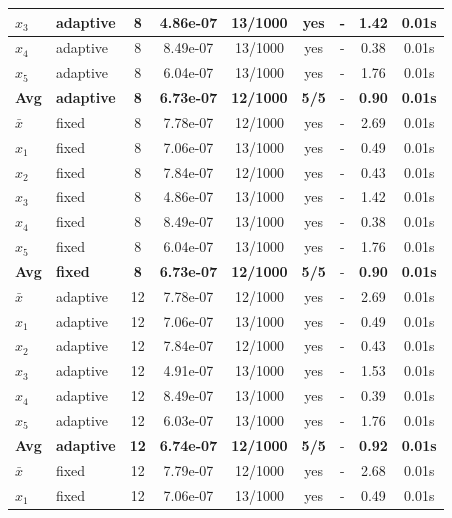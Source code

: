 \begin{longtable}{|l|l|c|c|c|c|c|c|c|}
\hline
$x_3$ & adaptive & 8 & 4.86e-07 & 13/1000 & yes & - & 1.42 & 0.01s \\
\hline
$x_4$ & adaptive & 8 & 8.49e-07 & 13/1000 & yes & - & 0.38 & 0.01s \\
\hline
$x_5$ & adaptive & 8 & 6.04e-07 & 13/1000 & yes & - & 1.76 & 0.01s \\
\hline
\hline\hline
\textbf{Avg} & \textbf{adaptive} & \textbf{8} & \textbf{6.73e-07} & \textbf{12/1000} & \textbf{5/5} & - & \textbf{0.90} & \textbf{0.01s} \\
\hline\hline
\hline
$\bar{x}$ & fixed & 8 & 7.78e-07 & 12/1000 & yes & - & 2.69 & 0.01s \\
\hline
$x_1$ & fixed & 8 & 7.06e-07 & 13/1000 & yes & - & 0.49 & 0.01s \\
\hline
$x_2$ & fixed & 8 & 7.84e-07 & 12/1000 & yes & - & 0.43 & 0.01s \\
\hline
$x_3$ & fixed & 8 & 4.86e-07 & 13/1000 & yes & - & 1.42 & 0.01s \\
\hline
$x_4$ & fixed & 8 & 8.49e-07 & 13/1000 & yes & - & 0.38 & 0.01s \\
\hline
$x_5$ & fixed & 8 & 6.04e-07 & 13/1000 & yes & - & 1.76 & 0.01s \\
\hline
\hline\hline
\textbf{Avg} & \textbf{fixed} & \textbf{8} & \textbf{6.73e-07} & \textbf{12/1000} & \textbf{5/5} & - & \textbf{0.90} & \textbf{0.01s} \\
\hline\hline
$\bar{x}$ & adaptive & 12 & 7.78e-07 & 12/1000 & yes & - & 2.69 & 0.01s \\
\hline
$x_1$ & adaptive & 12 & 7.06e-07 & 13/1000 & yes & - & 0.49 & 0.01s \\
\hline
$x_2$ & adaptive & 12 & 7.84e-07 & 12/1000 & yes & - & 0.43 & 0.01s \\
\hline
$x_3$ & adaptive & 12 & 4.91e-07 & 13/1000 & yes & - & 1.53 & 0.01s \\
\hline
$x_4$ & adaptive & 12 & 8.49e-07 & 13/1000 & yes & - & 0.39 & 0.01s \\
\hline
$x_5$ & adaptive & 12 & 6.03e-07 & 13/1000 & yes & - & 1.76 & 0.01s \\
\hline
\hline\hline
\textbf{Avg} & \textbf{adaptive} & \textbf{12} & \textbf{6.74e-07} & \textbf{12/1000} & \textbf{5/5} & - & \textbf{0.92} & \textbf{0.01s} \\
\hline\hline
\hline
$\bar{x}$ & fixed & 12 & 7.79e-07 & 12/1000 & yes & - & 2.68 & 0.01s \\
\hline
$x_1$ & fixed & 12 & 7.06e-07 & 13/1000 & yes & - & 0.49 & 0.01s \\

\end{longtable}
